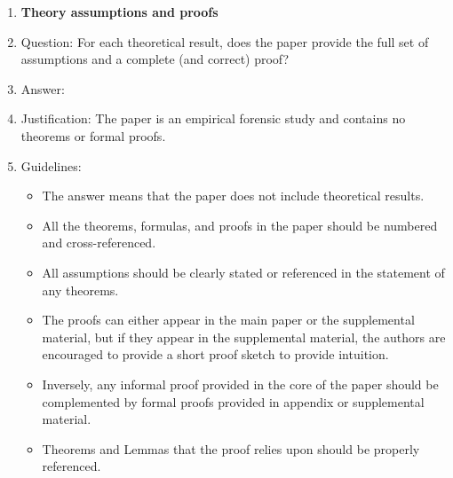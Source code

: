 \documentclass{article}
\begin{document}
\begin{enumerate}
\item {\bf Theory assumptions and proofs}
    \item[] Question: For each theoretical result, does the paper provide the full set of assumptions and a complete (and correct) proof?
    \item[] Answer: \answerNA{}
    \item[] Justification: The paper is an empirical forensic study and contains no theorems or formal proofs.
    \item[] Guidelines:
    \begin{itemize}
        \item The answer \answerNA{} means that the paper does not include theoretical results.
        \item All the theorems, formulas, and proofs in the paper should be numbered and cross-referenced.
        \item All assumptions should be clearly stated or referenced in the statement of any theorems.
        \item The proofs can either appear in the main paper or the supplemental material, but if they appear in the supplemental material, the authors are encouraged to provide a short proof sketch to provide intuition.
        \item Inversely, any informal proof provided in the core of the paper should be complemented by formal proofs provided in appendix or supplemental material.
        \item Theorems and Lemmas that the proof relies upon should be properly referenced.
    \end{itemize}


\end{enumerate}
\end{document}
